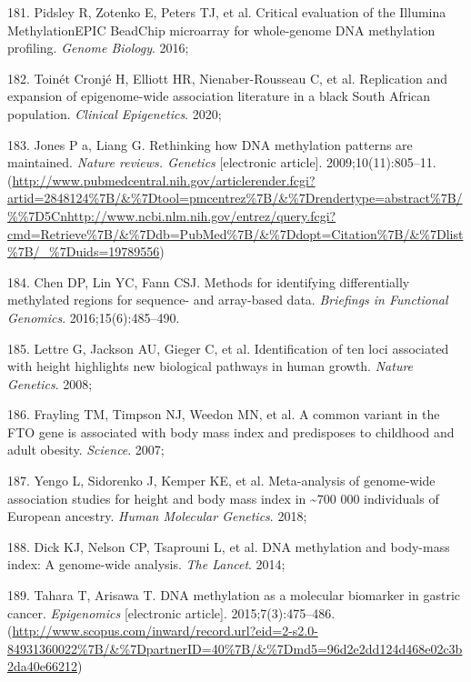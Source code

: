 \documentclass[11pt,twoside]{bristolthesis}
\newenvironment{cslreferences}%
  {}%
  {\par}
\begin{document}
\begin{cslreferences}
\leavevmode\hypertarget{ref-Pidsley2016}{}%
181. Pidsley R, Zotenko E, Peters TJ, et al. Critical evaluation of the Illumina MethylationEPIC BeadChip microarray for whole-genome DNA methylation profiling. \emph{Genome Biology}. 2016;

\leavevmode\hypertarget{ref-ToinetCronje2020}{}%
182. Toinét Cronjé H, Elliott HR, Nienaber-Rousseau C, et al. Replication and expansion of epigenome-wide association literature in a black South African population. \emph{Clinical Epigenetics}. 2020;

\leavevmode\hypertarget{ref-Jones2009}{}%
183. Jones P a, Liang G. Rethinking how DNA methylation patterns are maintained. \emph{Nature reviews. Genetics} {[}electronic article{]}. 2009;10(11):805--11. (\url{http://www.pubmedcentral.nih.gov/articlerender.fcgi?artid=2848124\%7B/\&\%7Dtool=pmcentrez\%7B/\&\%7Drendertype=abstract\%7B/\%\%7D5Cnhttp://www.ncbi.nlm.nih.gov/entrez/query.fcgi?cmd=Retrieve\%7B/\&\%7Ddb=PubMed\%7B/\&\%7Ddopt=Citation\%7B/\&\%7Dlist\%7B/_\%7Duids=19789556})

\leavevmode\hypertarget{ref-Chen2016}{}%
184. Chen DP, Lin YC, Fann CSJ. Methods for identifying differentially methylated regions for sequence- and array-based data. \emph{Briefings in Functional Genomics}. 2016;15(6):485--490.

\leavevmode\hypertarget{ref-Lettre2008}{}%
185. Lettre G, Jackson AU, Gieger C, et al. Identification of ten loci associated with height highlights new biological pathways in human growth. \emph{Nature Genetics}. 2008;

\leavevmode\hypertarget{ref-Frayling2007}{}%
186. Frayling TM, Timpson NJ, Weedon MN, et al. A common variant in the FTO gene is associated with body mass index and predisposes to childhood and adult obesity. \emph{Science}. 2007;

\leavevmode\hypertarget{ref-Yengo2018}{}%
187. Yengo L, Sidorenko J, Kemper KE, et al. Meta-analysis of genome-wide association studies for height and body mass index in \textasciitilde700 000 individuals of European ancestry. \emph{Human Molecular Genetics}. 2018;

\leavevmode\hypertarget{ref-Dick2014}{}%
188. Dick KJ, Nelson CP, Tsaprouni L, et al. DNA methylation and body-mass index: A genome-wide analysis. \emph{The Lancet}. 2014;

\leavevmode\hypertarget{ref-Tahara2015}{}%
189. Tahara T, Arisawa T. DNA methylation as a molecular biomarker in gastric cancer. \emph{Epigenomics} {[}electronic article{]}. 2015;7(3):475--486. (\url{http://www.scopus.com/inward/record.url?eid=2-s2.0-84931360022\%7B/\&\%7DpartnerID=40\%7B/\&\%7Dmd5=96d2e2dd124d468e02c3b2da40e66212})


\end{cslreferences}
\end{document}
